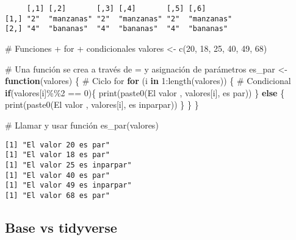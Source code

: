\documentclass[
  letterpaper,
  DIV=11,
  numbers=noendperiod]{scrartcl}
\newenvironment{Shaded}{\begin{snugshade}}{\end{snugshade}}
\newcommand{\CommentTok}[1]{\textcolor[rgb]{0.37,0.37,0.37}{#1}}
\newcommand{\ControlFlowTok}[1]{\textcolor[rgb]{0.00,0.23,0.31}{\textbf{#1}}}
\newcommand{\DecValTok}[1]{\textcolor[rgb]{0.68,0.00,0.00}{#1}}
\newcommand{\FunctionTok}[1]{\textcolor[rgb]{0.28,0.35,0.67}{#1}}
\newcommand{\NormalTok}[1]{\textcolor[rgb]{0.00,0.23,0.31}{#1}}
\newcommand{\OtherTok}[1]{\textcolor[rgb]{0.00,0.23,0.31}{#1}}
\newcommand{\SpecialCharTok}[1]{\textcolor[rgb]{0.37,0.37,0.37}{#1}}
\newcommand{\StringTok}[1]{\textcolor[rgb]{0.13,0.47,0.30}{#1}}
\begin{document}
\begin{verbatim}
     [,1] [,2]       [,3] [,4]       [,5] [,6]      
[1,] "2"  "manzanas" "2"  "manzanas" "2"  "manzanas"
[2,] "4"  "bananas"  "4"  "bananas"  "4"  "bananas" 
\end{verbatim}

\begin{Shaded}
\begin{Highlighting}[]
\CommentTok{\# Funciones + for + condicionales}
\NormalTok{valores }\OtherTok{\textless{}{-}} \FunctionTok{c}\NormalTok{(}\DecValTok{20}\NormalTok{, }\DecValTok{18}\NormalTok{, }\DecValTok{25}\NormalTok{, }\DecValTok{40}\NormalTok{, }\DecValTok{49}\NormalTok{, }\DecValTok{68}\NormalTok{)}

\CommentTok{\# Una función se crea a través de = y asignación de parámetros}
\NormalTok{es\_par }\OtherTok{\textless{}{-}} \ControlFlowTok{function}\NormalTok{(valores) \{}
    \CommentTok{\# Ciclo for }
    \ControlFlowTok{for}\NormalTok{ (i }\ControlFlowTok{in} \DecValTok{1}\SpecialCharTok{:}\FunctionTok{length}\NormalTok{(valores)) \{}
        \CommentTok{\# Condicional}
        \ControlFlowTok{if}\NormalTok{(valores[i]}\SpecialCharTok{\%\%}\DecValTok{2} \SpecialCharTok{==} \DecValTok{0}\NormalTok{)\{}
            \FunctionTok{print}\NormalTok{(}\FunctionTok{paste0}\NormalTok{(}\StringTok{\textquotesingle{}El valor \textquotesingle{}}\NormalTok{, valores[i], }\StringTok{\textquotesingle{} es par\textquotesingle{}}\NormalTok{))}
\NormalTok{        \} }\ControlFlowTok{else}\NormalTok{ \{}
            \FunctionTok{print}\NormalTok{(}\FunctionTok{paste0}\NormalTok{(}\StringTok{\textquotesingle{}El valor \textquotesingle{}}\NormalTok{, valores[i], }\StringTok{\textquotesingle{} es inparpar\textquotesingle{}}\NormalTok{))}
\NormalTok{        \}}
\NormalTok{    \}}
\NormalTok{\}}

\CommentTok{\# Llamar y usar función}
\FunctionTok{es\_par}\NormalTok{(valores)}
\end{Highlighting}
\end{Shaded}

\begin{verbatim}
[1] "El valor 20 es par"
[1] "El valor 18 es par"
[1] "El valor 25 es inparpar"
[1] "El valor 40 es par"
[1] "El valor 49 es inparpar"
[1] "El valor 68 es par"
\end{verbatim}

\subsection{Base vs tidyverse}\label{base-vs-tidyverse}
\end{document}
